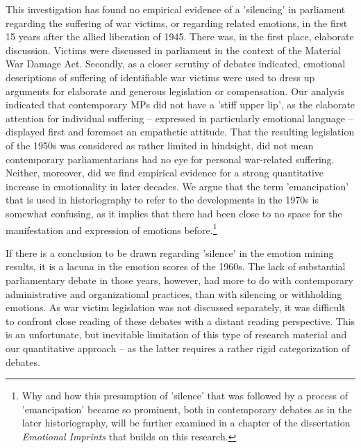 \documentclass{dhbenelux}
\begin{document}
This investigation has found no empirical evidence of a 'silencing' in parliament regarding the suffering of war victims, or regarding related emotions, in the first 15 years after the allied liberation of 1945. There was, in the first place, elaborate discussion. Victims were discussed in parliament in the context of the Material War Damage Act. Secondly, as a closer scrutiny of debates indicated, emotional descriptions of suffering of identifiable war victims were used to dress up arguments for elaborate and generous legislation or compensation. Our analysis indicated that contemporary MPs did not have a 'stiff upper lip', as the elaborate attention for individual suffering – expressed in particularly emotional language – displayed first and foremost an empathetic attitude. That the resulting legislation of the 1950s was considered as rather limited in hindsight, did not mean contemporary parliamentarians had no eye for personal war-related suffering. Neither, moreover, did we find empirical evidence for a strong quantitative increase in emotionality in later decades. We argue that the term 'emancipation' that is used in historiography to refer to the developments in the 1970s is somewhat confusing, as it implies that there had been close to no space for the manifestation and expression of emotions before.\footnote{Why and how this presumption of 'silence' that was followed by a process of 'emancipation' became so prominent, both in contemporary debates as in the later historiography, will be further examined in a chapter of the dissertation \textit{Emotional Imprints} that builds on this research.}

If there is a conclusion to be drawn regarding 'silence' in the emotion mining results, it is a lacuna in the emotion scores of the 1960s. The lack of substantial parliamentary debate in those years, however, had more to do with contemporary administrative and organizational practices, than with silencing or withholding emotions. As war victim legislation was not discussed separately, it was difficult to confront close reading of these debates with a distant reading perspective. This is an unfortunate, but inevitable limitation of this type of research material and our quantitative approach – as the latter requires a rather rigid categorization of debates.
\end{document}
